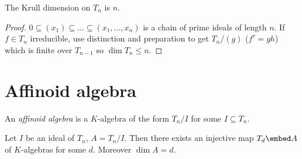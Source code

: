 \documentclass[a4paper]{article}
\begin{document}
\begin{proposition}
  The Krull dimension on \(T_n\) is \(n\).
\end{proposition}

\begin{proof}
  \(0 \subseteq (x_1) \subseteq \dots \subseteq (x_1, \dots, x_n)\) is a chain of prime ideals of length \(n\). If \(f \in T_n\) irreducible, use distinction and preparation to get \(T_n/(g)\) (\(f^\tau = gh\)) which is finite over \(T_{n - 1}\) so \(\dim T_n \leq n\).
\end{proof}

\section{Affinoid algebra}

\begin{definition}
  An \emph{affinoid algebra} is a \(K\)-algebra of the form \(T_n/I\) for some \(I \subseteq T_n\).
\end{definition}

\begin{theorem}
  Let \(I\) be an ideal of \(T_n\), \(A = T_n/I\). Then there exists an injective map \(T_d \embed A\) of \(K\)-algebras for some \(d\). Moreover \(\dim A = d\).
\end{theorem}


\printindex
\end{document}
